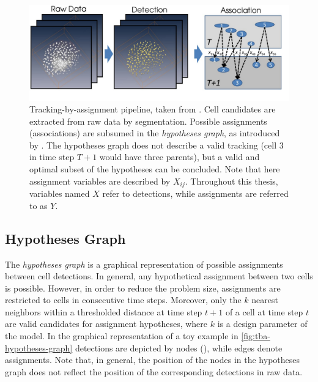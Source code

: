 \begin{figure}
    \centering
    \includegraphics[width=\textwidth]{images/chaingraph/pipeline.pdf}
    \caption[Tracking-by-assignment pipeline]{Tracking-by-assignment pipeline, taken from
        \citet[9]{kausler_13_tracking}. Cell candidates are extracted from raw data by
        segmentation. Possible assignments (associations) are subsumed in the \emph{hypotheses
            graph}, as introduced by \citet[Chapter~3.1]{kausler_13_tracking}. The
        hypotheses graph does not describe a valid tracking (\eg cell $3$ in time step $T+1$ would
        have three parents), but a valid and optimal subset of the hypotheses can be concluded. Note
        that here assignment variables are described by $X_{ij}$. Throughout this thesis, variables
        named $X$ refer to detections, while assignments are referred to as $Y$.}
    \label{fig:cg-hypotheses}
\end{figure}


\subsection{Hypotheses Graph}
\newsavebox{\captionHypotheses}

\label{subsec:hypotheses-graph}
The \emph{hypotheses graph} \citep[Chapter~3.1]{kausler_13_tracking} is a graphical
representation of possible assignments between cell detections. In general, any hypothetical
assignment between two cells is possible. However, in order to reduce the problem size, assignments
are restricted to cells in consecutive time steps. Moreover, only the $k$ nearest neighbors within a
thresholded distance at time step $t+1$ of a cell at time step $t$ are valid candidates for
assignment hypotheses, where $k$ is a design parameter of the model. In the graphical representation
of a toy example in \cref{fig:tba-hypotheses-graph} detections are depicted by nodes
({\protect\usebox{\captionHypotheses}}), while edges denote assignments. Note that, in general, the
position of the nodes in the hypotheses graph does not reflect the position of the corresponding
detections in raw data.


